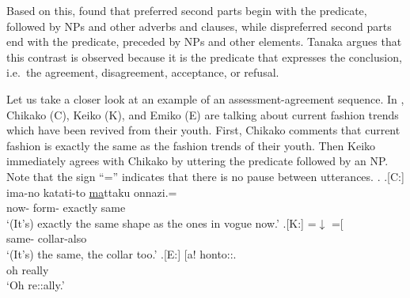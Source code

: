 Based on this,
 found that preferred second parts begin with the predicate, followed by NPs and other adverbs and  clauses,
while dispreferred second parts end with the predicate,
preceded by NPs and other elements.
Tanaka argues that this contrast is observed because
it is the predicate that expresses the conclusion, i.e.\ the agreement, disagreement, acceptance, or refusal.

Let us take a closer look at an example of an assessment-agreement sequence.
In \Next,
Chikako (C), Keiko (K), and Emiko (E) are talking about current fashion trends which have been revived from their youth.
First, Chikako comments that current fashion is exactly the same as the fashion trends of their youth.
Then Keiko immediately agrees with Chikako
by uttering the predicate followed by an NP.
Note that the sign ``='' indicates that there is no pause between utterances.
%
\ex.
 \ag.[C:] ima-no katati-to \ul{ma}ttaku onnazi.= \\
                now- form- exactly same \\
                `(It's) exactly the same shape as the ones in vogue now.'
 \bg.[K:] =$\downarrow$ =[ \\
          \hspace{0.2cm}same- \hspace{0.3cm}collar-also \\
          `(It's) the same, the collar too.'
 \bg.[E:] {\hspace{2.5cm}} [a! honto::. \\
          {} oh really \\
          {\hspace{2.5cm}}`Oh re::ally.'
          \hfill{\cite[406]{tanaka05}}

